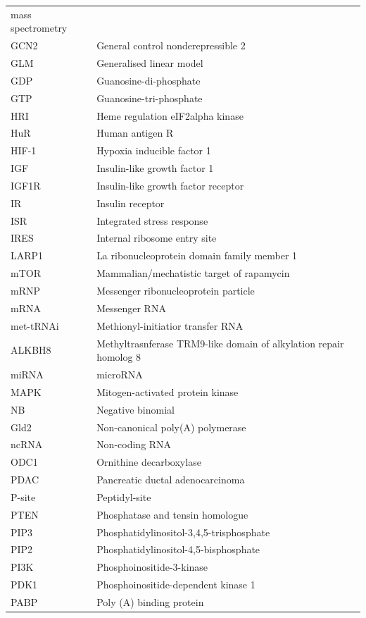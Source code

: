 \documentclass[12pt,openany]{book}
\begin{document}
\begin{longtable}{ll}
mass spectrometry\\
GCN2 & General control nonderepressible 2\\
\addlinespace
GLM & Generalised linear model\\
GDP & Guanosine-di-phosphate\\
GTP & Guanosine-tri-phosphate\\
HRI & Heme regulation eIF2alpha kinase\\
HuR & Human antigen R\\
\addlinespace
HIF-1 & Hypoxia inducible factor 1\\
IGF & Insulin-like growth factor 1\\
IGF1R & Insulin-like growth factor receptor\\
IR & Insulin receptor\\
ISR & Integrated stress response\\
\addlinespace
IRES & Internal ribosome entry site\\
LARP1 & La ribonucleoprotein domain family member 1\\
mTOR & Mammalian/mechatistic target of rapamycin\\
mRNP & Messenger ribonucleoprotein particle\\
mRNA & Messenger RNA\\
\addlinespace
met-tRNAi & Methionyl-initiatior transfer RNA\\
ALKBH8 & Methyltrasnferase TRM9-like domain of alkylation repair homolog 8\\
miRNA & microRNA\\
MAPK & Mitogen-activated protein
kinase\\
NB & Negative binomial\\
\addlinespace
Gld2 & Non-canonical poly(A) polymerase\\
ncRNA & Non-coding RNA\\
ODC1 & Ornithine decarboxylase\\
PDAC & Pancreatic ductal adenocarcinoma\\
P-site & Peptidyl-site\\
\addlinespace
PTEN & Phosphatase and tensin homologue\\
PIP3 & Phosphatidylinositol-3,4,5-trisphosphate\\
PIP2 & Phosphatidylinositol-4,5-bisphosphate\\
PI3K & Phosphoinositide-3-kinase\\
PDK1 & Phosphoinositide-dependent kinase 1\\
\addlinespace
PABP & Poly (A) binding protein\\

\end{longtable}
\end{document}
